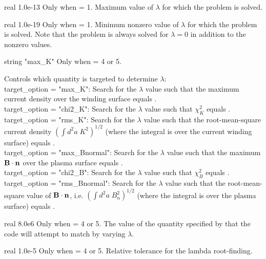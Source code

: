 \myhrule

{real}
{1.0e-13}
{Only when  = 1.}
{Maximum value of $\lambda$ for which the problem is solved.}

\myhrule

{real}
{1.0e-19}
{Only when  = 1.}
{Minimum nonzero value of $\lambda$ for which the problem is solved.
Note that the problem is always solved for $\lambda=0$ in addition to
the nonzero values.}

\myhrule

{string}
{{\ttfamily "max\_K"}}
{Only when  = 4 or 5.}
{Controls which quantity is targeted to determine $\lambda$:\\

{\ttfamily target\_option = "max\_K"}: Search for the $\lambda$ value such that the maximum
current density over the winding surface equals .\\

{\ttfamily target\_option = "chi2\_K"}: Search for the $\lambda$ value such that $\chi^2_K$ equals .\\

{\ttfamily target\_option = "rms\_K"}: Search for the $\lambda$ value such that the root-mean-square current density
$\left( \int d^2a\; K^2 \right)^{1/2}$ (where the integral is over the current winding surface) equals .\\

{\ttfamily target\_option = "max\_Bnormal"}: Search for the $\lambda$ value such that the maximum
${\mathbf B}\cdot{\mathbf n}$ over the plasma surface equals .\\

{\ttfamily target\_option = "chi2\_B"}: Search for the $\lambda$ value such that $\chi^2_B$ equals .\\

{\ttfamily target\_option = "rms\_Bnormal"}: Search for the $\lambda$ value such that the root-mean-square value of ${\mathbf B}\cdot{\mathbf n}$, i.e.
$\left( \int d^2a\; B_n^2 \right)^{1/2}$ (where the integral is over the plasma surface) equals .

}

\myhrule

{real}
{8.0e6}
{Only when  = 4 or 5.}
{The value of the quantity specified by  that the code will attempt to match
by varying $\lambda$.
}

\myhrule

{real}
{1.0e-5}
{Only when  = 4 or 5.}
{Relative tolerance for the lambda root-finding.}
